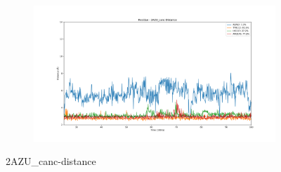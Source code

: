 \documentclass[fleqn,10pt]{wlscirep}
\begin{document}
\begin{figure}[!ht]
\begin{subfigure}{.45\textwidth}
   \end{subfigure}
    \begin{subfigure}{.45\textwidth}
     \centering
     \includegraphics[width=.95\linewidth]{2AZU_canc/2AZU_canc-dist_3.png}
   \end{subfigure}
\caption{2AZU_{canc}-distance}
\label{sup:2AZU_canc-dist}
\end{figure}  
\end{document}
